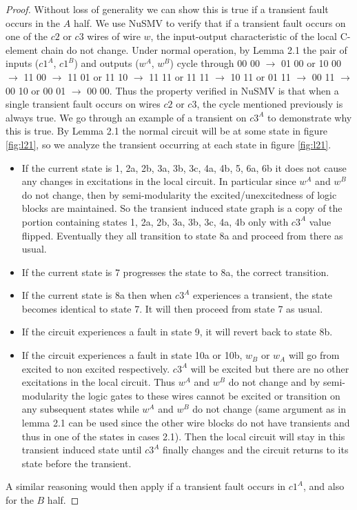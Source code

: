 \documentclass[12pt]{report}
\begin{document}
\begin{proof}
Without loss of generality we can show this is true if a transient fault occurs in the $A$ half.  We use NuSMV to verify that if a transient fault occurs on one of the $c2$ or $c3$ wires of wire $w$, the input-output characteristic of the local C-element chain do not change.  Under normal operation, by Lemma 2.1 the pair of inputs ($c1^A$, $c1^B$) and outputs ($w^A$, $w^B$) cycle through 00 00 $\rightarrow$ 01 00 or 10 00 $\rightarrow$ 11 00 $\rightarrow$ 11 01 or 11 10 $\rightarrow$ 11 11 or 11 11 $\rightarrow$ 10 11 or 01 11 $\rightarrow$ 00 11 $\rightarrow$ 00 10 or 00 01 $\rightarrow$ 00 00.  Thus the property verified in NuSMV is that when a single transient fault occurs on wires $c2$ or $c3$, the cycle mentioned previously is always true.    %
We go through an example of a transient on $c3^A$ to demonstrate why this is true.  By Lemma 2.1 the normal circuit will be at some state in figure \ref{fig:l21}, so we analyze the transient occurring at each state in figure \ref{fig:l21}.
\begin{itemize}
	\item
If the current state is 1, 2a, 2b, 3a, 3b, 3c, 4a, 4b, 5, 6a, 6b it does not cause any changes in excitations in the local circuit.  In particular since $w^A$ and $w^B$ do not change, then by semi-modularity the excited/unexcitedness of logic blocks are maintained.  So the transient induced state graph is a copy of the portion containing states 1, 2a, 2b, 3a, 3b, 3c, 4a, 4b only with $c3^A$ value flipped. Eventually they all transition to state 8a and proceed from there as usual.
	\item
If the current state is 7 progresses the state to 8a, the correct transition.	
	\item
      If the current state is 8a then when $c3^A$ experiences a transient, the state
 becomes identical to state 7.  It will then proceed from state 7 as usual.   
	\item
If the circuit experiences a fault in state 9, it will revert back to state 8b.  
	\item
If the circuit experiences a fault in state 10a or 10b, $w_B$ or $w_A$ will go from excited to non excited respectively.  $c3^A$ will be excited but there are no other excitations in the local circuit.  Thus $w^A$ and $w^B$ do not change and by semi-modularity the logic gates to these wires cannot be excited or transition on any subsequent states while $w^A$ and $w^B$ do not change (same argument as in lemma 2.1 can be used since the other wire blocks do not have transients and thus in one of the states in cases 2.1).  Then the local circuit will stay in this transient induced state until $c3^A$ finally changes and the circuit returns to its state before the transient.
\end{itemize}
A similar reasoning would then apply if a transient fault occurs in $c1^A$, and also for the $B$ half.  
\end{proof}
\end{document}
